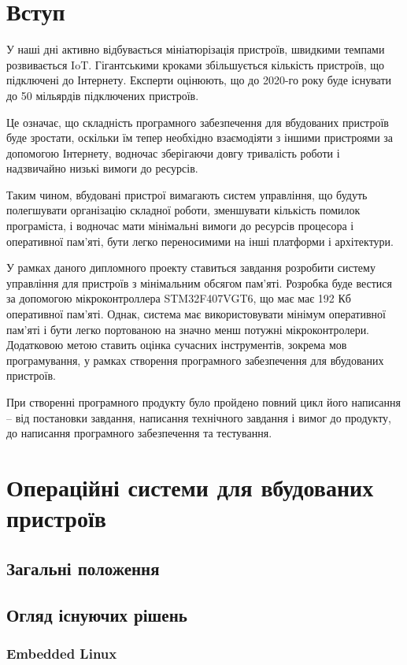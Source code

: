 \documentclass[oneside,14pt,a4paper,final]{myextreport}
\newcommand{\specialchapter}[1]{\chapter*{#1}\addcontentsline{toc}{chapter}{#1}}
\begin{document}
\specialchapter{Вступ}

У наші дні активно відбувається мініатюрізація пристроїв, швидкими темпами розвивається \ac{IoT}. Гігантськими кроками збільшується кількість пристроїв, що підключені до Інтернету. Експерти оцінюють, що до 2020-го року буде існувати до 50 мільярдів підключених пристроїв\cite{dave-evans:IoT}.

Це означає, що складність програмного забезпечення для вбудованих пристроїв буде зростати, оскільки їм тепер необхідно взаємодіяти з іншими пристроями за допомогою Інтернету, водночас зберігаючи довгу тривалість роботи і надзвичайно низькі вимоги до ресурсів.

Таким чином, вбудовані пристрої вимагають систем управління, що будуть полегшувати організацію складної роботи, зменшувати кількість помилок програміста, і водночас мати мінімальні вимоги до ресурсів процесора і оперативної пам'яті, бути легко переносимими на інші платформи і архітектури.

У рамках даного дипломного проекту ставиться завдання розробити систему управління для пристроїв з мінімальним обсягом пам'яті. Розробка буде вестися за допомогою мікроконтроллера STM32F407VGT6, що має має 192 Кб оперативної пам'яті. Однак, система має використовувати мінімум оперативної пам'яті і бути легко портованою на значно менш потужні мікроконтролери. Додатковою метою ставить оцінка сучасних інструментів, зокрема мов програмування, у рамках створення програмного забезпечення для вбудованих пристроїв.

При створенні програмного продукту було пройдено повний цикл його написання -- від постановки завдання, написання технічного завдання і вимог до продукту, до написання програмного забезпечення та тестування.

\chapter{Операційні системи для вбудованих пристроїв}
\section{Загальні положення}

\section{Огляд існуючих рішень}\label{existing-solutions}
\subsection{Embedded Linux}
\end{document}
